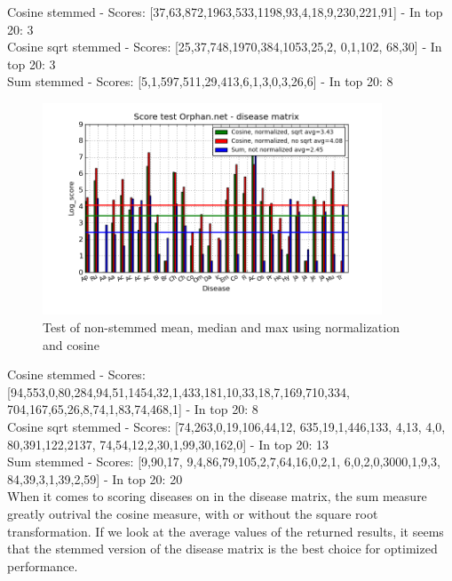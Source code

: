  
Cosine stemmed - Scores: [37,63,872,1963,533,1198,93,4,18,9,230,221,91] - In top 20: 3 \\
Cosine sqrt stemmed - Scores: [25,37,748,1970,384,1053,25,2, 0,1,102, 68,30] - In top 20: 3 \\
Sum stemmed - Scores: [5,1,597,511,29,413,6,1,3,0,3,26,6] - In top 20: 8

\begin{figure}[h!]
        \begin{center}
          \includegraphics[width=0.9\textwidth]{barcharts/diseaseMatrix_orphan_hist_NOTnorm_3000_s_cos_sqrt_cos_sum_nn.png}
        \end{center}
        \caption{Test of non-stemmed mean, median and max using normalization and cosine}
        \label{diseaseMatrix_orphan_hist_NOTnorm_3000_s_cos_sqrt_cos_sum_nn}
\end{figure}

 
Cosine stemmed - Scores: [94,553,0,80,284,94,51,1454,32,1,433,181,10,33,18,7,169,710,334, 704,167,65,26,8,74,1,83,74,468,1] - In top 20: 8 \\
Cosine sqrt stemmed - Scores: [74,263,0,19,106,44,12, 635,19,1,446,133, 4,13, 4,0, 80,391,122,2137, 74,54,12,2,30,1,99,30,162,0] - In top 20: 13 \\
Sum stemmed - Scores: [9,90,17, 9,4,86,79,105,2,7,64,16,0,2,1, 6,0,2,0,3000,1,9,3, 84,39,3,1,39,2,59] - In top 20: 20 \\

When it comes to scoring diseases on in the disease matrix, the sum measure greatly outrival the cosine measure, with or without the square root transformation. If we look at the average values of the returned results, it seems that the stemmed version of the disease matrix is the best choice for optimized performance. \\

